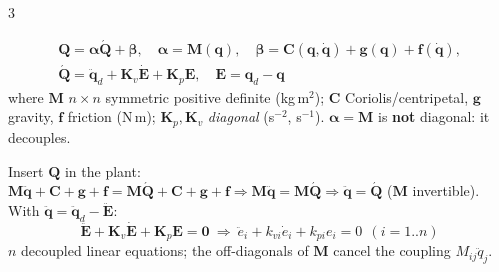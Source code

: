 \begin{multicols}{3}
\begin{fbx}
\[\begin{gathered}\mathbf Q=\boldsymbol\alpha\acute{\mathbf Q}+\boldsymbol\beta,\quad \boldsymbol\alpha=\mathbf M(\mathbf q),\quad \boldsymbol\beta=\mathbf C(\mathbf q,\dot{\mathbf q})+\mathbf g(\mathbf q)+\mathbf f(\dot{\mathbf q}),\\ \acute{\mathbf Q}=\ddot{\mathbf q}_d+\mathbf K_v\dot{\mathbf E}+\mathbf K_p\mathbf E,\quad \mathbf E=\mathbf q_d-\mathbf q\end{gathered}\]
where $\mathbf M$ $n\times n$ symmetric positive definite (kg\,m$^2$); $\mathbf C$ Coriolis/centripetal, $\mathbf g$ gravity, $\mathbf f$ friction (N\,m); $\mathbf K_p,\mathbf K_v$ \emph{diagonal} (s$^{-2}$, s$^{-1}$). $\boldsymbol\alpha=\mathbf M$ is \textbf{not} diagonal: it decouples.
\end{fbx}
\begin{deriv}
Insert $\mathbf Q$ in the plant: $\mathbf M\ddot{\mathbf q}+\mathbf C+\mathbf g+\mathbf f=\mathbf M\acute{\mathbf Q}+\mathbf C+\mathbf g+\mathbf f\Rightarrow\mathbf M\ddot{\mathbf q}=\mathbf M\acute{\mathbf Q}\Rightarrow\ddot{\mathbf q}=\acute{\mathbf Q}$ ($\mathbf M$ invertible). With $\ddot{\mathbf q}=\ddot{\mathbf q}_d-\ddot{\mathbf E}$:
\[\boxed{\ddot{\mathbf E}+\mathbf K_v\dot{\mathbf E}+\mathbf K_p\mathbf E=\mathbf 0}\ \Rightarrow\ \ddot e_i+k_{vi}\dot e_i+k_{pi}e_i=0\ \ (i=1..n)\]
$n$ decoupled linear equations; the off-diagonals of $\mathbf M$ cancel the coupling $M_{ij}\ddot q_j$.
\end{deriv}
\begin{wnfig}
\wnAqtrue
\def\wnDD{\ddot{\mathbf q}_d}\def\wnD{\dot{\mathbf q}_d}\def\wnR{\mathbf q_d}\def\wnKp{\mathbf K_p}\def\wnKv{\mathbf K_v}\def\wnAl{\mathbf M(\mathbf q)}\def\wnBe{\mathbf C(\mathbf q,\dot{\mathbf q}){+}\mathbf g(\mathbf q){+}\mathbf f(\dot{\mathbf q})}\def\wnPl{\text{Manipulator}}\def\wnU{\mathbf Q}\def\wnP{\mathbf q}\def\wnV{\dot{\mathbf q}}\def\wnE{\mathbf E}\def\wnEd{\dot{\mathbf E}}\def\wnFp{\acute{\mathbf Q}}
\resizebox{\linewidth}{!}{\wnloop}\par
{}

\end{wnfig}
\end{multicols}
